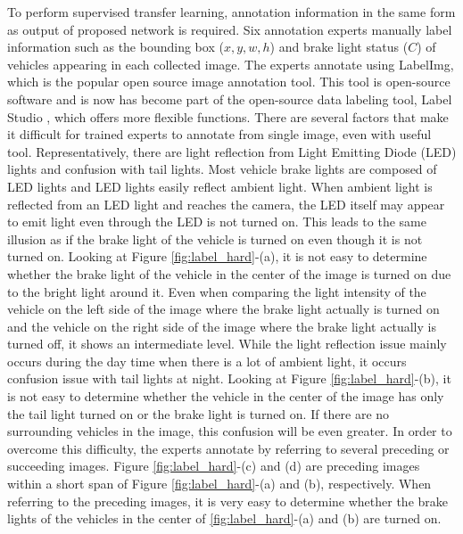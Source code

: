 To perform supervised transfer learning, annotation information in the same form as output of proposed network is required.
Six annotation experts manually label information such as the bounding box ($x, y, w, h$) and brake light status ($C$) of vehicles appearing in each collected image.
The experts annotate using LabelImg, which is the popular open source image annotation tool.
This tool is open-source software and is now has become part of the open-source data labeling tool, Label Studio \cite{Label_Studio}, which offers more flexible functions.
There are several factors that make it difficult for trained experts to annotate from single image, even with useful tool.
Representatively, there are light reflection from Light Emitting Diode (LED) lights and confusion with tail lights.
Most vehicle brake lights are composed of LED lights and LED lights easily reflect ambient light.
When ambient light is reflected from an LED light and reaches the camera, the LED itself may appear to emit light even through the LED is not turned on.
This leads to the same illusion as if the brake light of the vehicle is turned on even though it is not turned on.
Looking at Figure \ref{fig:label_hard}-(a), it is not easy to determine whether the brake light of the vehicle in the center of the image is turned on due to the bright light around it. 
Even when comparing the light intensity of the vehicle on the left side of the image where the brake light actually is turned on and the vehicle on the right side of the image where the brake light actually is turned off, it shows an intermediate level.
While the light reflection issue mainly occurs during the day time when there is a lot of ambient light, it occurs confusion issue with tail lights at night.
Looking at Figure \ref{fig:label_hard}-(b), it is not easy to determine whether the vehicle in the center of the image has only the tail light turned on or the brake light is turned on.
If there are no surrounding vehicles in the image, this confusion will be even greater.
In order to overcome this difficulty, the experts annotate by referring to several preceding or succeeding images. Figure \ref{fig:label_hard}-(c) and (d) are preceding images within a short span of Figure \ref{fig:label_hard}-(a) and (b), respectively.
When referring to the preceding images, it is very easy to determine whether the brake lights of the vehicles in the center of \ref{fig:label_hard}-(a) and (b) are turned on.




